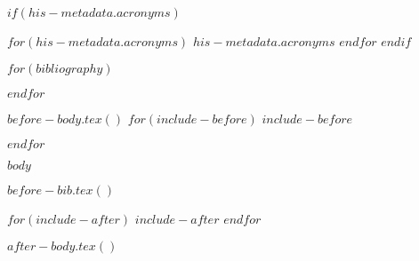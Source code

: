 \usepackage[capitalize,noabbrev,nameinlink]{cleveref} %
\graphicspath{{img/}{tex/}} %


$if(his-metadata.acronyms)$
\usepackage[acronym,toc=true,nomain,xindy,nonumberlist,automake]{glossaries-extra}
\makeglossaries
$for(his-metadata.acronyms)$
$his-metadata.acronyms$
$endfor$
$endif$

$for(bibliography)$

$endfor$



$before-body.tex()$
$for(include-before)$
$include-before$

$endfor$

$body$

$before-bib.tex()$

$for(include-after)$
$include-after$
$endfor$

$after-body.tex()$


